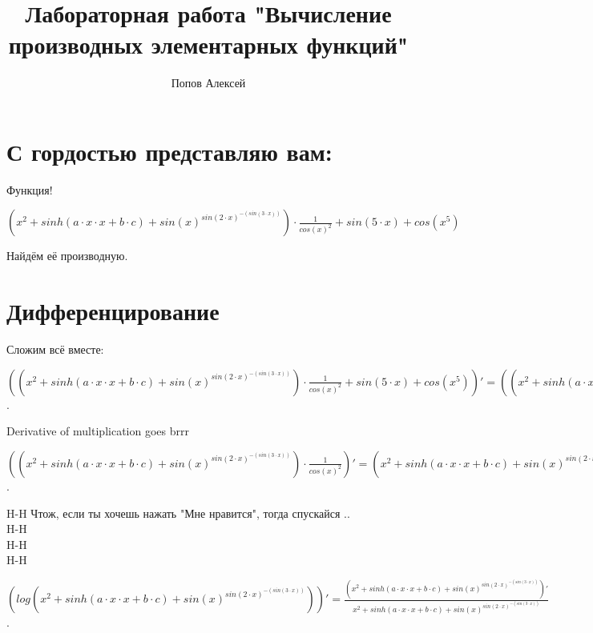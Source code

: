 \documentclass{article}
\title{ Лабораторная работа "Вычисление производных элементарных функций" }
\author{ Попов Алексей }
\begin{document}
\maketitle
\section{ С гордостью представляю вам: }
Функция!
\begin{center}$({x^{{2}}}+sinh(a \cdot x \cdot x+b \cdot c)+{sin(x)^{sin({2} \cdot x)^{-(sin({3} \cdot x))}}}) \cdot  \frac {1} {{{cos(x)^{{2}}}}}+sin({5} \cdot x)+cos({x^{{5}}})$\end{center}
 Найдём её производную.\\
\section{ Дифференцирование }
Сложим всё вместе:\\
\begin{center}$(({x^{{2}}}+sinh(a \cdot x \cdot x+b \cdot c)+{sin(x)^{sin({2} \cdot x)^{-(sin({3} \cdot x))}}}) \cdot  \frac {1} {{{cos(x)^{{2}}}}}+sin({5} \cdot x)+cos({x^{{5}}}))'=(({x^{{2}}}+sinh(a \cdot x \cdot x+b \cdot c)+{sin(x)^{sin({2} \cdot x)^{-(sin({3} \cdot x))}}}) \cdot  \frac {1} {{{cos(x)^{{2}}}}})' + (sin({5} \cdot x))' + (cos({x^{{5}}}))'$.\end{center}Derivative of multiplication goes brrr\\
\begin{center}$(({x^{{2}}}+sinh(a \cdot x \cdot x+b \cdot c)+{sin(x)^{sin({2} \cdot x)^{-(sin({3} \cdot x))}}}) \cdot  \frac {1} {{{cos(x)^{{2}}}}})'=({x^{{2}}}+sinh(a \cdot x \cdot x+b \cdot c)+{sin(x)^{sin({2} \cdot x)^{-(sin({3} \cdot x))}}}) \cdot  \frac {1} {{{cos(x)^{{2}}}}}\cdot (Log({x^{{2}}}+sinh(a \cdot x \cdot x+b \cdot c)+{sin(x)^{sin({2} \cdot x)^{-(sin({3} \cdot x))}}})' + log( \frac {1} {{{cos(x)^{{2}}}}})')$.\end{center}
H-H Чтож, если ты хочешь нажать "Мне нравится", тогда спускайся ..\\
H-H\\
H-H\\
H-H\\
\begin{center}$(log({x^{{2}}}+sinh(a \cdot x \cdot x+b \cdot c)+{sin(x)^{sin({2} \cdot x)^{-(sin({3} \cdot x))}}}))'= \frac { ({x^{{2}}}+sinh(a \cdot x \cdot x+b \cdot c)+{sin(x)^{sin({2} \cdot x)^{-(sin({3} \cdot x))}}})'} {{x^{{2}}}+sinh(a \cdot x \cdot x+b \cdot c)+{sin(x)^{sin({2} \cdot x)^{-(sin({3} \cdot x))}}}}$.\end{center}
\end{document}
